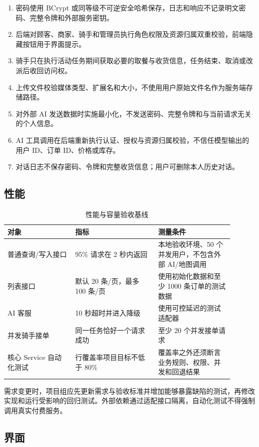 \begin{enumerate}
  \item 密码使用 BCrypt 或同等级不可逆安全哈希保存，日志和响应不记录明文密码、完整令牌和外部服务密钥。
  \item 后端对顾客、商家、骑手和管理员执行角色权限及资源归属双重校验，前端隐藏按钮用于界面提示。
  \item 骑手只在执行活动任务期间获取必要的取餐与收货信息，任务结束、取消或改派后收回访问权。
  \item 上传文件校验媒体类型、扩展名和大小，不使用用户原始文件名作为服务端存储路径。
  \item 对外部 AI 发送数据时实施最小化，不发送密码、完整令牌和与当前请求无关的个人信息。
  \item AI 工具调用在后端重新执行认证、授权与资源归属校验，不信任模型输出的用户 ID、订单 ID、价格或库存。
  \item 对话日志不保存密码、令牌和完整收货信息；用户可删除本人历史对话。
\end{enumerate}

\subsection{性能}

\begin{longtable}{|L{0.27\linewidth}|L{0.33\linewidth}|L{0.30\linewidth}|}
\caption{性能与容量验收基线}\label{tab:performance}\\ \hline
\textbf{对象} & \textbf{指标} & \textbf{测量条件} \\ \hline
普通查询/写入接口 & 95\% 请求在 2 秒内返回 & 本地验收环境、50 个并发用户，不包含外部 AI/地图调用 \\ \hline
列表接口 & 默认 20 条/页，最多 100 条/页 & 使用初始化数据和至少 1000 条订单的测试数据 \\ \hline
AI 客服 & 10 秒超时并进入降级 & 使用可控延迟的测试适配器 \\ \hline
并发骑手接单 & 同一任务恰好一个请求成功 & 至少 20 个并发接单请求 \\ \hline
核心 Service 自动化测试 & 行覆盖率项目目标不低于 80\% & 覆盖率之外还须断言业务规则、权限、并发和回退结果 \\ \hline
\end{longtable}

需求变更时，项目组应先更新需求与验收标准并增加能够暴露缺陷的测试，再修改实现和运行受影响的回归测试。外部依赖通过适配接口隔离，自动化测试不得强制调用真实付费服务。

\subsection{界面}

